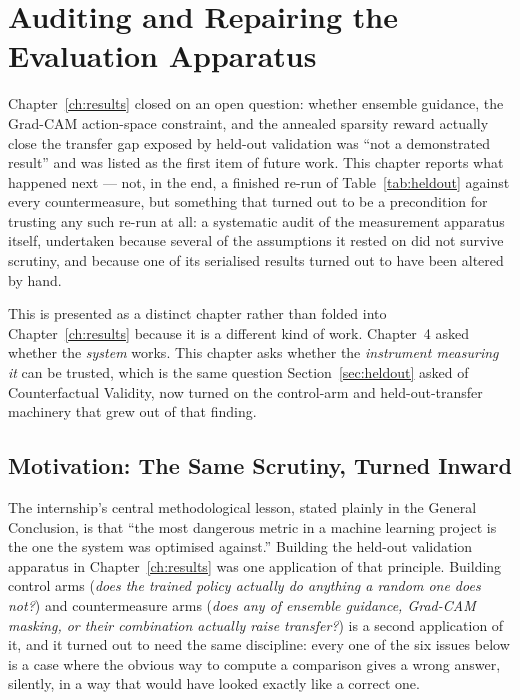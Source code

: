 \chapter{Auditing and Repairing the Evaluation Apparatus}
\label{ch:integrity}

Chapter~\ref{ch:results} closed on an open question: whether ensemble
guidance, the Grad-CAM action-space constraint, and the annealed sparsity
reward actually close the transfer gap exposed by held-out validation was
``not a demonstrated result'' and was listed as the first item of future
work. This chapter reports what happened next --- not, in the end, a
finished re-run of Table~\ref{tab:heldout} against every countermeasure, but
something that turned out to be a precondition for trusting any such re-run
at all: a systematic audit of the measurement apparatus itself, undertaken
because several of the assumptions it rested on did not survive scrutiny,
and because one of its serialised results turned out to have been altered by
hand.

This is presented as a distinct chapter rather than folded into
Chapter~\ref{ch:results} because it is a different kind of work. Chapter~4
asked whether the \emph{system} works. This chapter asks whether the
\emph{instrument measuring it} can be trusted, which is the same question
Section~\ref{sec:heldout} asked of Counterfactual Validity, now turned on
the control-arm and held-out-transfer machinery that grew out of that
finding.

\section{Motivation: The Same Scrutiny, Turned Inward}

The internship's central methodological lesson, stated plainly in the
General Conclusion, is that ``the most dangerous metric in a machine
learning project is the one the system was optimised against.'' Building
the held-out validation apparatus in Chapter~\ref{ch:results} was one
application of that principle. Building control arms (\emph{does the
trained policy actually do anything a random one does not?}) and
countermeasure arms (\emph{does any of ensemble guidance, Grad-CAM masking,
or their combination actually raise transfer?}) is a second application of
it, and it turned out to need the same discipline: every one of the six
issues below is a case where the obvious way to compute a comparison gives
a wrong answer, silently, in a way that would have looked exactly like a
correct one.

